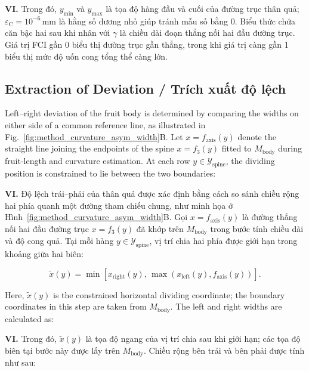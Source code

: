 \documentclass[final,1p,11pt,longtitle]{elsarticle}
\newenvironment{viet}{\par\smallskip\begingroup\color{viColor}\noindent\textbf{VI. }\ignorespaces}{\par\endgroup\smallskip}
\begin{document}
\begin{viet}
Trong đó, $y_{\min}$ và $y_{\max}$ là tọa độ hàng đầu và cuối của đường trục thân quả; $\varepsilon_{\mathrm{C}}=10^{-6}\,\mathrm{mm}$ là hằng số dương nhỏ giúp tránh mẫu số bằng 0. Biểu thức chứa căn bậc hai sau khi nhân với $\gamma$ là chiều dài đoạn thẳng nối hai đầu đường trục. Giá trị FCI gần 0 biểu thị đường trục gần thẳng, trong khi giá trị càng gần 1 biểu thị mức độ uốn cong tổng thể càng lớn.
\end{viet}

\subsection*{Extraction of Deviation / {\color{viColor} Trích xuất độ lệch}}

Left--right deviation of the fruit body is determined by comparing the widths on either side of a common reference line, as illustrated in Fig.~\ref{fig:method_curvature_asym_width}B. Let $x=f_{\mathrm{axis}}(y)$ denote the straight line joining the endpoints of the spine $x=f_3(y)$ fitted to $M_{\mathrm{body}}$ during fruit-length and curvature estimation. At each row $y\in\mathcal{Y}_{\mathrm{spine}}$, the dividing position is constrained to lie between the two boundaries:

\begin{viet}
Độ lệch trái--phải của thân quả được xác định bằng cách so sánh chiều rộng hai phía quanh một đường tham chiếu chung, như minh họa ở Hình~\ref{fig:method_curvature_asym_width}B. Gọi $x=f_{\mathrm{axis}}(y)$ là đường thẳng nối hai đầu đường trục $x=f_3(y)$ đã khớp trên $M_{\mathrm{body}}$ trong bước tính chiều dài và độ cong quả. Tại mỗi hàng $y\in\mathcal{Y}_{\mathrm{spine}}$, vị trí chia hai phía được giới hạn trong khoảng giữa hai biên:
\end{viet}

\begin{equation}
\tilde{x}(y)=\min\!\left[x_{\mathrm{right}}(y),\,\max\!\left(x_{\mathrm{left}}(y),f_{\mathrm{axis}}(y)\right)\right].
\end{equation}

Here, $\tilde{x}(y)$ is the constrained horizontal dividing coordinate; the boundary coordinates in this step are taken from $M_{\mathrm{body}}$. The left and right widths are calculated as:

\begin{viet}
Trong đó, $\tilde{x}(y)$ là tọa độ ngang của vị trí chia sau khi giới hạn; các tọa độ biên tại bước này được lấy trên $M_{\mathrm{body}}$. Chiều rộng bên trái và bên phải được tính như sau:
\end{viet}
\end{document}
